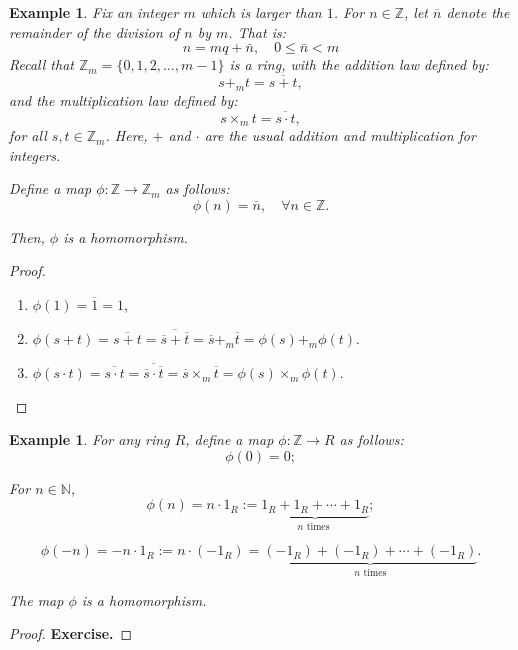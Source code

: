\documentclass[a4paper,12pt]{report}
\newcommand{\ol}[1]{\overline{#1}}
\newcounter{statement}
\numberwithin{statement}{chapter}
\newtheorem{eg}[statement]{\bf Example}
\numberwithin{equation}{chapter}
\numberwithin{section}{chapter}
\numberwithin{subsection}{section}
\begin{document}
\begin{eg}
Fix an integer $m$ which is larger than $1$.  For $n \in \mathbb{Z}$, let $\ol{n}$ denote the remainder of the division
of $n$ by $m$.  That is:
\[
n = mq + \bar{n}, \quad 0 \leq \bar{n} < m
\]
Recall that $\mathbb{Z}_m = \{0, 1, 2, \ldots, m - 1\}$ is a ring,
with the addition law defined by:
\[
s +_m t = \ol{s + t},
\]
and the multiplication law defined by:
\[
s\times_m t = \ol{s\cdot t},
\]
for all $s, t \in \mathbb{Z}_m$.  Here, $+$ and $\cdot$ are the usual
addition and multiplication for integers.


Define a map $\phi : \mathbb{Z} \rightarrow \mathbb{Z}_m $ as follows:
\[
\phi(n) = \ol{n}, \quad \forall n \in \mathbb{Z}.
\]

Then, $\phi$ is a homomorphism.

\end{eg}
\begin{proof}

\begin{enumerate}
\item 
$\phi(1) = \ol{1} = 1$,

\item 
$\phi(s + t) = \ol{s + t} = \ol{\ol{s} + \ol{t}} = \ol{s} +_m \ol{t} = \phi(s) +_m \phi(t)$.

\item 
$\phi(s \cdot t) = \ol{s\cdot t} = \ol{\ol{s}\cdot\ol{t}} = \ol{s}\times_m\ol{t} = \phi(s)\times_m\phi(t)$.
\end{enumerate}


\end{proof}




\begin{eg}
For any ring $R$, define a map $\phi : \mathbb{Z} \rightarrow R$ as follows:
\[
\phi(0) = 0;
\]

For $n \in \mathbb{N}$,
\[
\phi(n) =  n\cdot 1_R := \underbrace{1_R + 1_R + \cdots + 1_R}_{n\text{ times }};
\]

\[
\phi(-n) =  -n\cdot 1_R := n\cdot(-1_R) =  \underbrace{(-1_R) + (-1_R) + \cdots + (-1_R)}_{n\text{ times}}.
\]

The map $\phi$ is a homomorphism.

\end{eg}
\begin{proof}

 {\bf Exercise.} 

\end{proof}
\end{document}
